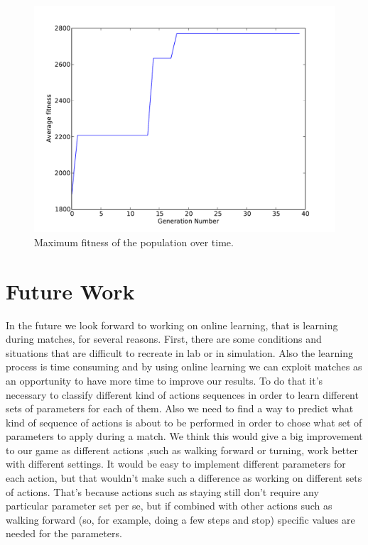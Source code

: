 \documentclass{article}
\begin{document}
\begin{figure}
	\center
	\includegraphics[width=.8\textwidth]{images/max_fitness}
	\caption{Maximum fitness of the population over time.}
	\label{fig:max}
\end{figure}


 

\section{Future Work}
 

In the future we look forward to working on online learning, that is learning during matches, for several reasons. First, there are some conditions and situations that are difficult to recreate in lab or in simulation. Also the learning process is time consuming and by using online learning we can exploit matches as an opportunity to have more time to improve our results. To do that it's necessary to classify different kind of actions sequences in order to learn different sets of parameters for each of them. Also we need to find a way to predict what kind of sequence of actions is about to be performed in order to chose what set of parameters to apply during a match. We think this would give a big improvement to our game as different actions ,such as walking forward or turning, work better with different settings. It would be easy to implement different parameters for each action, but that wouldn't make such a difference as working on different sets of actions. That's because actions such as staying still don't require any particular parameter set per se, but if combined with other actions such as walking forward (so, for example, doing a few steps and stop) specific values are needed for the parameters. 




\end{document}
